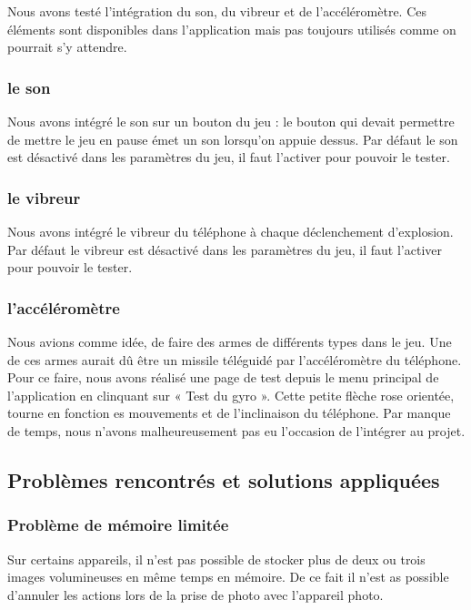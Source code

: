 \documentclass{report}
\begin{document}
Nous avons testé l’intégration du son, du vibreur et de l’accéléromètre.
Ces éléments sont disponibles dans l’application mais pas toujours
utilisés comme on pourrait s’y attendre.

\subsubsection{le son}

Nous avons intégré le son sur un bouton du jeu : le bouton qui devait
permettre de mettre le jeu en pause émet un son lorsqu’on appuie dessus.
Par défaut le son est désactivé dans les paramètres du jeu, il faut
l’activer pour pouvoir le tester.

\subsubsection{le vibreur}

Nous avons intégré le vibreur du téléphone à chaque déclenchement
d’explosion. Par défaut le vibreur est désactivé dans les paramètres du
jeu, il faut l’activer pour pouvoir le tester.

\subsubsection{l’accéléromètre}

Nous avions comme idée, de faire des armes de différents types dans le
jeu. Une de ces armes aurait dû être un missile téléguidé par
l’accéléromètre du téléphone. Pour ce faire, nous avons réalisé une page
de test depuis le menu principal de l’application en clinquant sur
« Test du gyro ». Cette petite flèche rose orientée, tourne en fonction
es mouvements et de l’inclinaison du téléphone. Par manque de temps, nous
n’avons malheureusement pas eu l’occasion de l’intégrer au projet.

\subsection{Problèmes rencontrés et solutions appliquées}

\subsubsection{Problème de mémoire limitée}

Sur certains appareils, il n’est pas possible de stocker plus de deux ou
trois images volumineuses en même temps en mémoire. De ce fait il n’est
as possible d’annuler les actions lors de la prise de photo avec
l’appareil photo.
\end{document}
